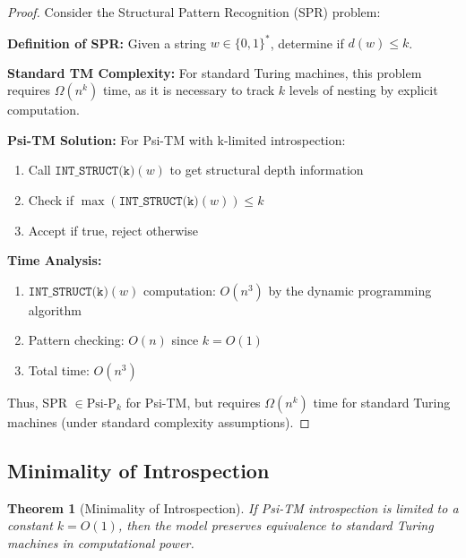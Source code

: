 \documentclass[11pt]{article}
\newtheorem{theorem}{Theorem}
\begin{document}
\begin{proof}
Consider the Structural Pattern Recognition (SPR) problem:

\textbf{Definition of SPR:} 
Given a string $w \in \{0,1\}^*$, determine if $d(w) \leq k$.

\textbf{Standard TM Complexity:}
For standard Turing machines, this problem requires $\Omega(n^k)$ time, as it is necessary to track $k$ levels of nesting by explicit computation.

\textbf{Psi-TM Solution:}
For Psi-TM with k-limited introspection:
\begin{enumerate}
\item Call $\texttt{INT\_STRUCT(k)}(w)$ to get structural depth information
\item Check if $\max(\texttt{INT\_STRUCT(k)}(w)) \leq k$
\item Accept if true, reject otherwise
\end{enumerate}

\textbf{Time Analysis:}
\begin{enumerate}
\item $\texttt{INT\_STRUCT(k)}(w)$ computation: $O(n^3)$ by the dynamic programming algorithm
\item Pattern checking: $O(n)$ since $k = O(1)$
\item Total time: $O(n^3)$
\end{enumerate}

Thus, SPR $\in \text{Psi-P}_k$ for Psi-TM, but requires $\Omega(n^k)$ time for standard Turing machines (under standard complexity assumptions).
\end{proof}

\subsection{Minimality of Introspection}

\begin{theorem}[Minimality of Introspection]
If Psi-TM introspection is limited to a constant $k = O(1)$, then the model preserves equivalence to standard Turing machines in computational power.
\end{theorem}
\end{document}
